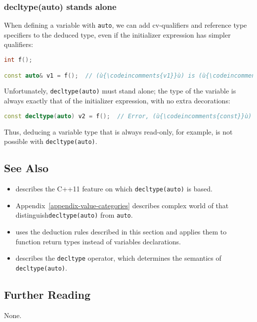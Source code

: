 \subsubsection[\lstinline!decltype(auto)! stands alone]{{\SubsubsecCode decltype(auto)} stands alone}\label{decltype(auto)-stands-alone}

When defining a variable with \lstinline!auto!, we can add cv-qualifiers
and reference type specifiers to the deduced type, even if the
initializer expression has simpler qualifiers:

\begin{lstlisting}[language=C++]
int f();

const auto& v1 = f();  // (ù{\codeincomments{v1}}ù) is (ù{\codeincomments{const int\&}}ù).
\end{lstlisting}
    

Unfortunately, \lstinline!decltype(auto)! must stand alone; the type of the
variable is always exactly that of the initializer expression, with no
extra decorations:

\begin{lstlisting}[language=C++]
const decltype(auto) v2 = f();  // Error, (ù{\codeincomments{const}}ù) with (ù{\codeincomments{decltype(auto)}}ù)
\end{lstlisting}
    

Thus, deducing a variable type that is always read-only, for example, is
not possible with \lstinline!decltype(auto)!.

\subsection[See Also]{See Also}\label{see-also}

\begin{itemize}
\item{describes the C++11 feature on which \lstinline!decltype(auto)! is based.}
\item{Appendix~\ref{appendix-value-categories} describes complex world of  that distinguish\linebreak[4] \lstinline!decltype(auto)! from \lstinline!auto!.}
\item{uses the deduction rules described in this section and applies them to function return types instead of variables declarations.}
\item{describes the \lstinline!decltype! operator, which determines the semantics of \lstinline!decltype(auto)!.}
\end{itemize}

\subsection[Further Reading]{Further Reading}\label{further-reading}

None.


